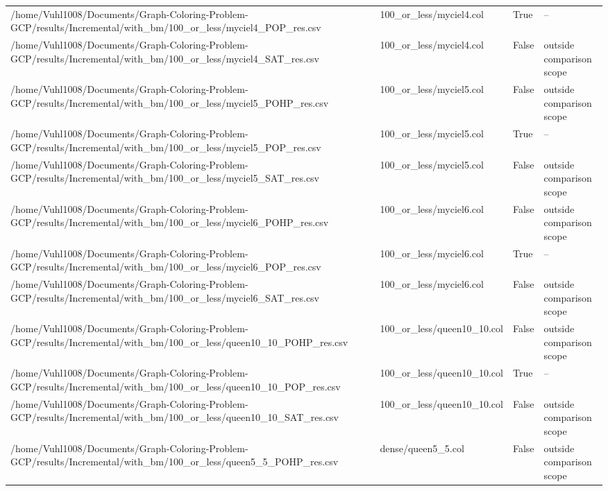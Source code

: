 \begin{table}[htbp]
\begin{tabular}{llll}
/home/Vuhl1008/Documents/Graph-Coloring-Problem-GCP/results/Incremental/with\_bm/100\_or\_less/myciel4\_POP\_res.csv & 100\_or\_less/myciel4.col & True & -- \\
/home/Vuhl1008/Documents/Graph-Coloring-Problem-GCP/results/Incremental/with\_bm/100\_or\_less/myciel4\_SAT\_res.csv & 100\_or\_less/myciel4.col & False & outside comparison scope \\
/home/Vuhl1008/Documents/Graph-Coloring-Problem-GCP/results/Incremental/with\_bm/100\_or\_less/myciel5\_POHP\_res.csv & 100\_or\_less/myciel5.col & False & outside comparison scope \\
/home/Vuhl1008/Documents/Graph-Coloring-Problem-GCP/results/Incremental/with\_bm/100\_or\_less/myciel5\_POP\_res.csv & 100\_or\_less/myciel5.col & True & -- \\
/home/Vuhl1008/Documents/Graph-Coloring-Problem-GCP/results/Incremental/with\_bm/100\_or\_less/myciel5\_SAT\_res.csv & 100\_or\_less/myciel5.col & False & outside comparison scope \\
/home/Vuhl1008/Documents/Graph-Coloring-Problem-GCP/results/Incremental/with\_bm/100\_or\_less/myciel6\_POHP\_res.csv & 100\_or\_less/myciel6.col & False & outside comparison scope \\
/home/Vuhl1008/Documents/Graph-Coloring-Problem-GCP/results/Incremental/with\_bm/100\_or\_less/myciel6\_POP\_res.csv & 100\_or\_less/myciel6.col & True & -- \\
/home/Vuhl1008/Documents/Graph-Coloring-Problem-GCP/results/Incremental/with\_bm/100\_or\_less/myciel6\_SAT\_res.csv & 100\_or\_less/myciel6.col & False & outside comparison scope \\
/home/Vuhl1008/Documents/Graph-Coloring-Problem-GCP/results/Incremental/with\_bm/100\_or\_less/queen10\_10\_POHP\_res.csv & 100\_or\_less/queen10\_10.col & False & outside comparison scope \\
/home/Vuhl1008/Documents/Graph-Coloring-Problem-GCP/results/Incremental/with\_bm/100\_or\_less/queen10\_10\_POP\_res.csv & 100\_or\_less/queen10\_10.col & True & -- \\
/home/Vuhl1008/Documents/Graph-Coloring-Problem-GCP/results/Incremental/with\_bm/100\_or\_less/queen10\_10\_SAT\_res.csv & 100\_or\_less/queen10\_10.col & False & outside comparison scope \\
/home/Vuhl1008/Documents/Graph-Coloring-Problem-GCP/results/Incremental/with\_bm/100\_or\_less/queen5\_5\_POHP\_res.csv & dense/queen5\_5.col & False & outside comparison scope \\

\end{tabular}
\end{table}

